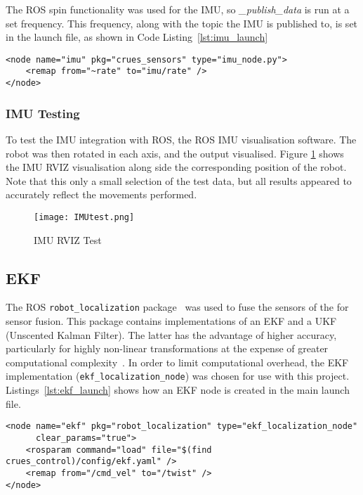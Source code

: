 The ROS spin functionality was used for the IMU, so
\textit{\_publish\_data} is run at a set
frequency. This frequency, along with the topic the
IMU is published to, is set in the launch file, as
shown in Code Listing~\ref{lst:imu_launch}

\begin{lstlisting}[caption={\texttt{\_publish\_data} in \texttt{imu\_node}}, label={lst:imu_message}, style=xml]
<node name="imu" pkg="crues_sensors" type="imu_node.py">
    <remap from="~rate" to="imu/rate" />
</node>
\end{lstlisting}

\subsubsection{IMU Testing}\label{soft/odometry/imu/test}

To test the IMU integration with ROS, the ROS IMU visualisation software. 
The robot was then rotated in each axis, and the output visualised.  
Figure \ref{fig:imu_test} shows the IMU RVIZ visualisation along side the 
corresponding position of the robot. Note that this only a small selection 
of the test data, but all results appeared to accurately reflect the 
movements performed.

\begin{figure}[!ht]
	\centering
	\texttt{[image: IMUtest.png]}
	\caption{IMU RVIZ Test}\label{fig:imu_test}
\end{figure}

\subsection{EKF}\label{soft/odometry/ekf}

The ROS \verb|robot_localization| package~\cite{RosRobotLocalization} was used
to fuse the sensors of the for sensor fusion. This package contains implementations of
an EKF and a UKF (Unscented Kalman Filter). The latter has the advantage of higher
accuracy, particularly for highly non-linear transformations at the expense of
greater computational complexity~\cite{wan_unscented_2000}. In order to limit
computational overhead, the EKF implementation (\verb|ekf_localization_node|) was
chosen for use with this project. Listings~\ref{lst:ekf_launch} shows how an EKF
node is created in the main launch file.

\begin{lstlisting}[caption={EKF node in ROS launch file}, label={lst:ekf_launch}, style=xml]
<node name="ekf" pkg="robot_localization" type="ekf_localization_node"
      clear_params="true">
    <rosparam command="load" file="$(find crues_control)/config/ekf.yaml" />
    <remap from="/cmd_vel" to="/twist" />
</node>
\end{lstlisting}

